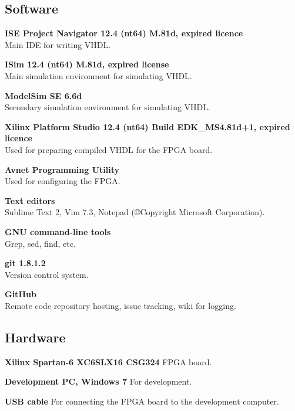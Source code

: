 \subsection{Software}
\begin{description}
    \item{\textbf{ISE Project Navigator 12.4 (nt64) M.81d, expired licence}} \\
        Main IDE for writing VHDL.
    \item{\textbf{ISim 12.4 (nt64) M.81d, expired license}} \\
        Main simulation environment for simulating VHDL.
    \item{\textbf{ModelSim SE 6.6d}} \\
        Secondary simulation environment for simulating VHDL.
    \item{\textbf{Xilinx Platform Studio 12.4 (nt64) Build EDK\_MS4.81d+1, expired licence}} \\
        Used for preparing compiled VHDL for the FPGA board.
    \item{\textbf{Avnet Programming Utility}} \\
        Used for configuring the FPGA.
    \item{\textbf{Text editors}} \\
        Sublime Text 2, Vim 7.3, Notepad (©Copyright Microsoft Corporation).
    \item{\textbf{GNU command-line tools}} \\
        Grep, sed, find, etc.
    \item{\textbf{git 1.8.1.2}} \\
        Version control system.
    \item{\textbf{GitHub}} \\
        Remote code repository hosting, issue tracking, wiki for logging.
\end{description}

\subsection{Hardware}
\begin{description}
\item{\textbf{Xilinx Spartan-6 XC6SLX16 CSG324}}
    FPGA board.
\item{\textbf{Development PC, Windows 7}}
    For development.
\item{\textbf{USB cable}}
    For connecting the FPGA board to the development computer.
\end{description}

\bigskip
